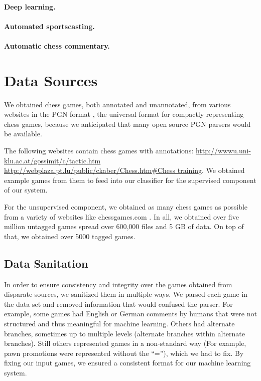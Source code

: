 \documentclass[11pt]{article}
\begin{document}
\paragraph{Deep learning.}
\paragraph{Automated sportscasting.}
\paragraph{Automatic chess commentary.}

\section{Data Sources}

We obtained chess games, both annotated and unannotated, from various websites in the PGN format \cite{pgn}, the universal format for compactly representing chess games, because we anticipated that many open source PGN parsers would be available.

The following websites contain chess games with annotations: \url{http://wwwu.uni-klu.ac.at/gossimit/c/tactic.htm} \url{http://webplaza.pt.lu/public/ckaber/Chess.htm#Chess training}. We obtained example games from them to feed into our classifier for the supervised component of our system.

For the unsupervised component, we obtained as many chess games as possible from a variety of websites like chessgames.com \cite{other sites}. In all, we obtained over five million untagged games spread over 600,000 files and 5 GB of data. On top of that, we obtained over 5000 tagged games.

\subsection{Data Sanitation}	
In order to ensure consistency and integrity over the games obtained from disparate sources, we sanitized them in multiple ways. We parsed each game in the data set and removed information that would confused the parser. For example, some games had English or German comments by humans that were not structured and thus meaningful for machine learning. Others had alternate branches, sometimes up to multiple levels (alternate branches within alternate branches). Still others represented games in a non-standard way (For example, pawn promotions were represented without the “=”), which we had to fix. By fixing our input games, we ensured a consistent format for our machine learning system.
\end{document}
